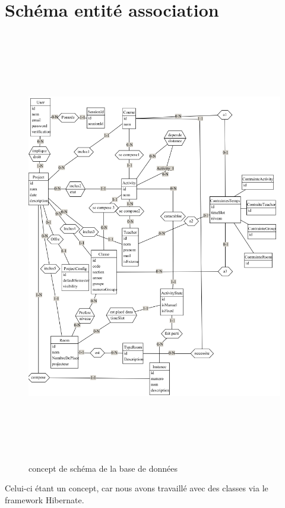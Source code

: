 \newpage

\section{Schéma entité association}
\label{annexe/espace_nom}

\begin{figure}[!h]
	\begin{center}
		\includegraphics[width=15cm,height=19cm]{EA.png}
		\caption{concept de schéma de la base de données}
	\end{center}
\end{figure}
Celui-ci étant un concept, car nous avons travaillé avec des classes via le framework Hibernate.
